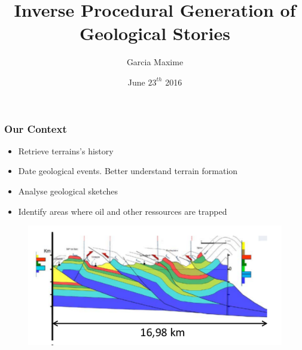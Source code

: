 \documentclass{beamer}
\title[Master of Science in Informatics at Grenoble: Master Thesis Defence]{Inverse Procedural Generation of Geological Stories}
\author{Garcia Maxime}
\institute{Mosig GVR}
\date{June $23^{th}$ 2016}
\begin{document}
	
    \begin{frame}[label=(intro)]
	\titlepage
    \end{frame}
	
	 \begin{frame}
	 \frametitle{Our Context}
	 \begin{itemize}
	 \item Retrieve terrains's history
	 \item Date geological events. Better understand terrain formation
	 \item Analyse geological sketches 
	 \item Identify areas where oil and other ressources are trapped
	 \end{itemize}
	 	\begin{figure}[H]
	\centering
	\includegraphics[scale=0.5]{Wraped_Section.png}
		\end{figure}
	 \end{frame}
	
\end{document}
